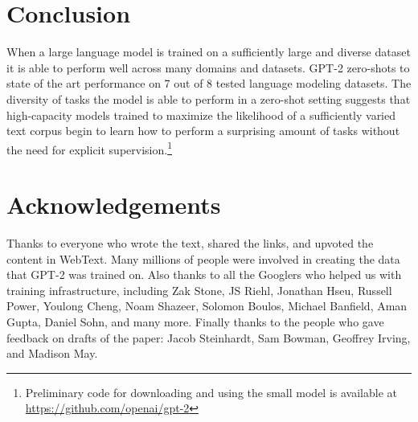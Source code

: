 \documentclass{article}
\begin{document}

\section{Conclusion}
When a large language model is trained on a sufficiently large and diverse dataset it is able to perform well across many domains and datasets. GPT-2 zero-shots to state of the art performance on 7 out of 8 tested language modeling datasets. The diversity of tasks the model is able to perform in a zero-shot setting suggests that high-capacity models trained to maximize the likelihood of a sufficiently varied text corpus begin to learn how to perform a surprising amount of tasks without the need for explicit supervision.\footnote{Preliminary code for downloading and using the small model is available at \url{https://github.com/openai/gpt-2}}


\section*{Acknowledgements}
Thanks to everyone who wrote the text, shared the links, and upvoted the content in WebText. Many millions of people were involved in creating the data that GPT-2 was trained on. Also thanks to all the Googlers who helped us with training infrastructure, including Zak Stone, JS Riehl, Jonathan Hseu, Russell Power, Youlong Cheng, Noam Shazeer, Solomon Boulos, Michael Banfield, Aman Gupta, Daniel Sohn, and many more. Finally thanks to the people who gave feedback on drafts of the paper: Jacob Steinhardt, Sam Bowman, Geoffrey Irving, and Madison May.


\small{


}
\end{document}

